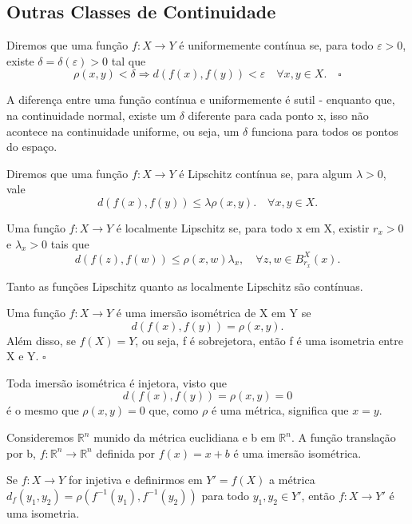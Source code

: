 \documentclass[metric_notes.tex]{subfiles}
\begin{document}
\subsection{Outras Classes de Continuidade}
\begin{def*}
	Diremos que uma função \(f:X\rightarrow Y\) é uniformemente contínua se, para todo \(\varepsilon >0\), existe \(\delta =\delta (\varepsilon )>0\) tal que
	\[
		\rho (x, y) < \delta \Rightarrow d(f(x), f(y)) < \varepsilon \quad \forall x, y\in X.\quad\square
	\]
\end{def*}
A diferença entre uma função contínua e uniformemente é sutil - enquanto que, na continuidade normal, existe um \(\delta \) diferente para cada ponto x, isso não acontece
na continuidade uniforme, ou seja, um \(\delta \) funciona para todos os pontos do espaço.
\begin{def*}
	Diremos que uma função \(f:X\rightarrow Y\) é Lipschitz contínua se, para algum \(\lambda >0\), vale
	\[
		d(f(x), f(y))\leq \lambda \rho (x, y).\quad \forall x, y\in X.
	\]
\end{def*}
\begin{def*}
	Uma função \(f:X\rightarrow Y\) é localmente Lipschitz se, para todo x em X, existir \(r_{x}>0\) e \(\lambda_{x}>0\) tais que
	\[
		d(f(z), f(w))\leq \rho (x, w)\lambda_{x},\quad \forall z, w\in B_{r_{x}}^{X}(x).
	\]
\end{def*}
Tanto as funções Lipschitz quanto as localmente Lipschitz são contínuas.
\begin{def*}
	Uma função \(f:X\rightarrow Y\) é uma imersão isométrica de X em Y se
	\[
		d(f(x), f(y)) = \rho (x, y).
	\]
	Além disso, se \(f(X) = Y\), ou seja, f é sobrejetora, então f é uma isometria entre X e Y. \(\square\)
\end{def*}
Toda imersão isométrica é injetora, visto que
\[
	d(f(x), f(y)) = \rho (x, y) = 0
\]
é o mesmo que \(\rho (x, y) = 0\) que, como \(\rho \) é uma métrica, significa que \(x=y\).
\begin{example}
	Consideremos \(\mathbb{R}^{n}\) munido da métrica euclidiana e b em \(\mathbb{R}^{n}.\) A função translação por b,
	\(f:\mathbb{R}^{n}\rightarrow \mathbb{R}^{n}\) definida por \(f(x) = x + b\) é uma imersão isométrica.
\end{example}
\begin{example}
	Se \(f:X\rightarrow Y\) for injetiva e definirmos em \(Y' = f(X)\) a métrica
	\(d_{f}(y_{1}, y_{2}) = \rho (f^{-1}(y_{1}), f^{-1}(y_{2}))\) para todo \(y_{1}, y_{2}\in Y'\), então
	\(f:X\rightarrow Y'\) é uma isometria.
\end{example}
\end{document}
